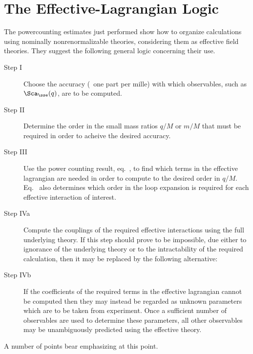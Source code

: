 \documentclass[12pt,epsf]{report}
\begin{document}
\section{The Effective-Lagrangian Logic}

The powercounting estimates just performed show how to
organize calculations using nominally nonrenormalizable
theories, considering them as effective field theories. 
They suggest the following general logic concerning 
their use.

\begin{description}

\item[Step I]
Choose the accuracy (\eg\ one part per mille) with which
observables, such as $\Sca_\sse(q)$, are to be computed.

\item[Step II]
Determine the order in the small mass ratios $q/M$ or $m/M$
that must be required in order to acheive the desired
accuracy.

\item[Step III]
Use the power counting result, eq.~, to
find which terms in the effective lagrangian are needed in
order to compute to the desired order in $q/M$.
Eq.~ also determines which order in the
loop expansion is required for each effective interaction
of interest.

\item[Step IVa]
Compute the couplings of the required effective
interactions using the full underlying theory. If this step
should prove to be impossible, due either to ignorance of
the underlying theory or to the intractability of the
required calculation, then it may be replaced by the
following alternative:

\item[Step IVb]
If the coefficients of the required terms in the effective
lagrangian cannot be computed then they may instead be
regarded as unknown parameters which are to be taken from
experiment. Once a sufficient number of observables are
used to determine these parameters, all other observables
may be unambiguously predicted using the effective theory.

\end{description}

A number of points bear emphasizing at this point.
\end{document}
